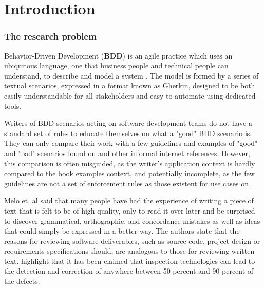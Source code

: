 \chapter{\label{chap:chap1}{Introduction}}


\subsection{The research problem}

Behavior-Driven Development (\textbf{BDD}) is an agile practice which uses an ubiquitous language, one that business people and technical people can understand, to describe and model a system \cite{Smart_2014}. The model is formed by a series of textual scenarios, expressed in a format known as Gherkin, designed to be both easily understandable for all stakeholders and easy to automate using dedicated tools. 

Writers of BDD scenarios acting on software development teams do not have a standard set of rules to educate themselves on what a "good" BDD scenario is. They can only compare their work with a few guidelines and examples of "good" and "bad" scenarios found on \cite{Smart_2014} and other informal internet references. However, this comparison is often misguided, as the writer's application context is hardly compared to the book examples context, and potentially incomplete, as the few guidelines are not a set of enforcement rules as those existent for use cases on \cite{Phalp_2011}. 

Melo et. al \cite{Melo_2001} said that many people have had the experience of writing a piece of text that is felt to be of high quality, only to read it over later and be surprised to discover grammatical, orthographic, and concordance mistakes as well as ideas that could simply be expressed in a better way. The authors state that the reasons for reviewing software deliverables, such as source code, project design or requirements specifications should, are analogous to those for reviewing written text. \cite{Laitenberger_2002} highlight that it has been claimed that inspection technologies can lead to the detection and correction of anywhere between 50 percent and 90 percent of the defects. 

